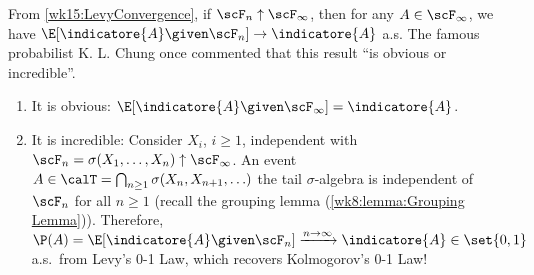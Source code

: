 \documentclass[../aipt.tex]{subfiles}
\begin{document}
\begin{Example}
From \cref{wk15:LevyConvergence}, if $\scF_n \uparrow \scF_\infty$, then for any $A\in\scF_\infty$, we have $\E[\indicatore{A} \given \scF_n] \to \indicatore{A}$ a.s. The famous probabilist K. L. Chung once commented that this result ``is obvious or incredible''. 
\begin{enumerate}
	\item It is obvious: $\E[\indicatore{A} \given \scF_\infty] = \indicatore{A}$.
	\item It is incredible: Consider $X_i$, $i\geq1$, independent with $\scF_n=\sigma(X_1,\ldots,X_n) \uparrow \scF_\infty$. An event $A \in \calT = \bigcap_{n\geq1} \sigma(X_n,X_{n+1},\ldots)$ the tail $\sigma$-algebra is independent of $\scF_n$ for all $n\geq1$ (recall the grouping lemma (\cref{wk8:lemma:Grouping Lemma})). Therefore, $\P(A) = \E[\indicatore{A} \given \scF_n] \xrightarrow{n\to\infty} \indicatore{A}\in\set{0,1}$ a.s.\ from Levy's 0-1 Law, which recovers Kolmogorov's 0-1 Law!
\end{enumerate}

\end{Example}

%

\end{document}
